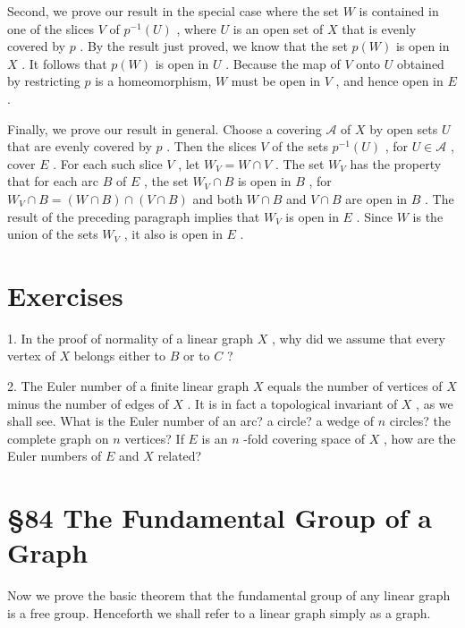 Second, we prove our result in the special case where the set \(W\) is contained in one of the slices \(V\) of \({p}^{-1}\left( U\right)\) , where \(U\) is an open set of \(X\) that is evenly covered by \(p\) . By the result just proved, we know that the set \(p\left( W\right)\) is open in \(X\) . It follows that \(p\left( W\right)\) is open in \(U\) . Because the map of \(V\) onto \(U\) obtained by restricting \(p\) is a homeomorphism, \(W\) must be open in \(V\) , and hence open in \(E\) .

Finally, we prove our result in general. Choose a covering \(\mathcal{A}\) of \(X\) by open sets \(U\) that are evenly covered by \(p\) . Then the slices \(V\) of the sets \({p}^{-1}\left( U\right)\) , for \(U \in  \mathcal{A}\) , cover \(E\) . For each such slice \(V\) , let \({W}_{V} = W \cap  V\) . The set \({W}_{V}\) has the property that for each arc \(B\) of \(E\) , the set \({W}_{V} \cap  B\) is open in \(B\) , for \({W}_{V} \cap  B = \left( {W \cap  B}\right)  \cap  \left( {V \cap  B}\right)\) and both \(W \cap  B\) and \(V \cap  B\) are open in \(B\) . The result of the preceding paragraph implies that \({W}_{V}\) is open in \(E\) . Since \(W\) is the union of the sets \({W}_{V}\) , it also is open in \(E\) .

\section*{Exercises}

1. In the proof of normality of a linear graph \(X\) , why did we assume that every vertex of \(X\) belongs either to \(B\) or to \(C\) ?

2. The Euler number of a finite linear graph \(X\) equals the number of vertices of \(X\) minus the number of edges of \(X\) . It is in fact a topological invariant of \(X\) , as we shall see. What is the Euler number of an arc? a circle? a wedge of \(n\) circles? the complete graph on \(n\) vertices? If \(E\) is an \(n\) -fold covering space of \(X\) , how are the Euler numbers of \(E\) and \(X\) related?

\section*{ \S 84 The Fundamental Group of a Graph}

Now we prove the basic theorem that the fundamental group of any linear graph is a free group. Henceforth we shall refer to a linear graph simply as a graph.

